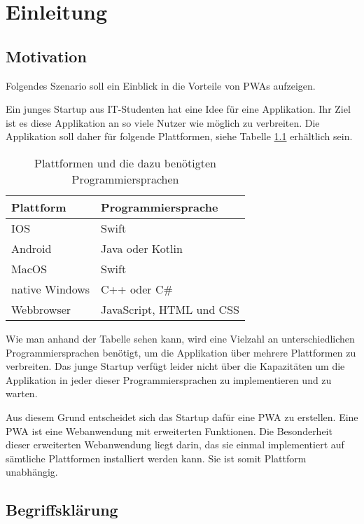 
\chapter{Einleitung}
\section{Motivation}

Folgendes Szenario soll ein Einblick in die Vorteile von \ac{PWAs} aufzeigen. 

Ein junges Startup aus IT-Studenten hat eine Idee für eine Applikation. Ihr Ziel ist es diese Applikation an so viele Nutzer wie möglich zu verbreiten. Die Applikation soll daher für folgende Plattformen, siehe Tabelle \ref{plattformen} erhältlich sein.

\begin{table}[!htb]\label{plattformen}
\begin{tabularx}{\textwidth}{|X|X|}
    \hline
    \textbf{Plattform} & \textbf{Programmiersprache} \\
    \hline
    \hline
    IOS & Swift \\
    \hline
    Android & Java oder Kotlin\\
    \hline
    MacOS & Swift \\
    \hline 
    native Windows & C++ oder C\# \\
    \hline
    Webbrowser & JavaScript, HTML und CSS \\
    \hline
\end{tabularx}
\caption{Plattformen und die dazu benötigten Programmiersprachen}
\end{table}

Wie man anhand der Tabelle sehen kann, wird eine Vielzahl an unterschiedlichen Programmiersprachen benötigt, um die Applikation über mehrere Plattformen zu verbreiten. Das junge Startup verfügt leider nicht über die Kapazitäten um die Applikation in jeder dieser Programmiersprachen zu implementieren und zu warten. 

Aus diesem Grund entscheidet sich das Startup dafür eine \ac{PWA} zu erstellen. Eine PWA ist eine Webanwendung mit erweiterten Funktionen. Die Besonderheit dieser erweiterten Webanwendung liegt darin, das sie einmal implementiert auf sämtliche Plattformen installiert werden kann. Sie ist somit Plattform unabhängig. 

\section{Begriffsklärung}

